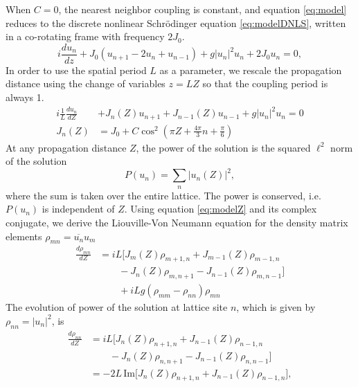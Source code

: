 \documentclass[reprint, amsmath,amssymb,aps,pre]{revtex4-2}
\begin{document}
When $C = 0$, the nearest neighbor coupling is constant, and equation \cref{eq:model} reduces to the discrete nonlinear Schr\"odinger equation \cref{eq:modelDNLS}, written in a co-rotating frame with frequency $2 J_0$.
\begin{equation}\label{eq:modelDNLS}
i \frac{d u_n}{d z} + J_0( u_{n+1} - 2 u_n + u_{n-1}) + g|u_n|^2 u_n + 2 J_0 u_n = 0,
\end{equation}
In order to use the spatial period $L$ as a parameter, we rescale the propagation distance using the change of variables $z = L Z$ so that the coupling period is always 1.
\begin{equation}\label{eq:modelZ}
\begin{aligned}
i \frac{1}{L} \frac{d u_n}{d Z} &+ J_n(Z) u_{n+1} + J_{n-1}(Z)u_{n-1} + g|u_n|^2 u_n = 0 \\
J_n(Z) &= J_0 + C \cos^2\left( \pi Z + \frac{4 \pi}{3} n + \frac{\pi}{6} \right)
\end{aligned}
\end{equation}
At any propagation distance $Z$, the power of the solution is the squared $\ell^2$ norm of the solution
\begin{equation}
P(u_n) = \sum_{n} | u_n(Z) |^2,
\end{equation} 
where the sum is taken over the entire lattice. The power is conserved, i.e. $P(u_n)$ is independent of $Z$. Using equation \cref{eq:modelZ} and its complex conjugate, we derive the Liouville-Von Neumann equation for the density matrix elements $\rho_{mn} = \overline{u_n} u_m$
\begin{equation}\label{eq:rhoeq}
\begin{aligned}
\frac{d \rho_{mn}}{dZ} &= iL \Big[ J_m(Z) \rho_{m+1,n} + J_{m-1}(Z) \rho_{m-1,n} \\
&\qquad -J_n(Z) \rho_{m,n+1} - J_{n-1}(Z) \rho_{m,n-1} \big] \\
&\qquad + iLg\left( \rho_{mm} - \rho_{nn} \right) \rho_{mn}
\end{aligned}
\end{equation}
The evolution of power of the solution at lattice site $n$, which is given by $\rho_{nn} = | u_n |^2$, is
\begin{equation}\label{eq:powerevol}
\begin{aligned}
\frac{d\rho_{nn} }{dZ} &= iL \Big[ J_n(Z) \rho_{n+1,n} + J_{n-1}(Z) \rho_{n-1,n} \\
&\qquad -J_n(Z) \rho_{n,n+1} - J_{n-1}(Z) \rho_{n,n-1} \big] \\
&= -2L\,\text{Im}\Big[ J_n(Z) \rho_{n+1,n} + J_{n-1}(Z) \rho_{n-1,n} \Big],
\end{aligned}
\end{equation}
\end{document}
